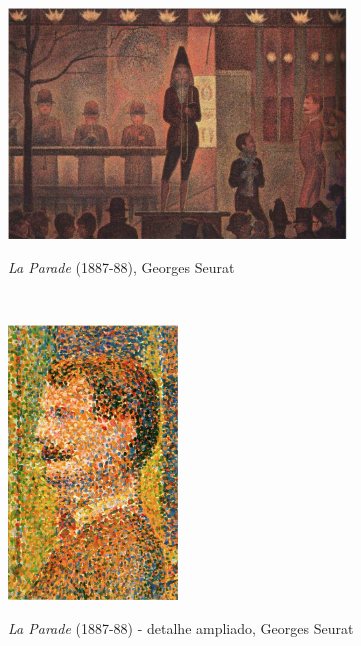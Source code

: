 \begin{figure}[H]
    \centering
    \caption{\textit{La Parade} (1887-88), Georges Seurat}
	\vspace*{0,2cm}
    \includegraphics[width=0.8\textwidth]{./04-figuras/seurat_la_parede}
    \label{fig:seurat_la_parede}
\end{figure}
\vspace*{-0,9cm}
{\raggedright {}}\\
   
\begin{figure}[H]
    \centering
    \caption{\textit{La Parade} (1887-88) - detalhe ampliado, Georges Seurat}
	\vspace*{0,2cm}
    \includegraphics[width=0.4\textwidth]{./04-figuras/seurat_la_parede_detalhe}
    \label{fig:seurat_la_parede_detalhe}
\end{figure}
\vspace*{-0,9cm}
{\raggedright {}}\\

